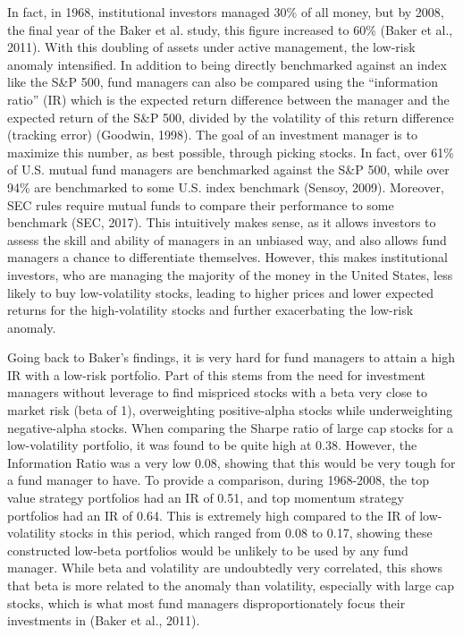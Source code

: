\documentclass[12pt,twoside]{reedthesis}
\theoremstyle{definition}
\theoremstyle{definition}
\theoremstyle{definition}
\theoremstyle{remark}
\begin{document}
In fact, in 1968, institutional investors managed 30\% of all money, but
by 2008, the final year of the Baker et al. study, this figure increased
to 60\% (Baker et al., 2011). With this doubling of assets under active
management, the low-risk anomaly intensified. In addition to being
directly benchmarked against an index like the S\&P 500, fund managers
can also be compared using the ``information ratio'' (IR) which is the
expected return difference between the manager and the expected return
of the S\&P 500, divided by the volatility of this return difference
(tracking error) (Goodwin, 1998). The goal of an investment manager is
to maximize this number, as best possible, through picking stocks. In
fact, over 61\% of U.S. mutual fund managers are benchmarked against the
S\&P 500, while over 94\% are benchmarked to some U.S. index benchmark
(Sensoy, 2009). Moreover, SEC rules require mutual funds to compare
their performance to some benchmark (SEC, 2017). This intuitively makes
sense, as it allows investors to assess the skill and ability of
managers in an unbiased way, and also allows fund managers a chance to
differentiate themselves. However, this makes institutional investors,
who are managing the majority of the money in the United States, less
likely to buy low-volatility stocks, leading to higher prices and lower
expected returns for the high-volatility stocks and further exacerbating
the low-risk anomaly.

Going back to Baker's findings, it is very hard for fund managers to
attain a high IR with a low-risk portfolio. Part of this stems from the
need for investment managers without leverage to find mispriced stocks
with a beta very close to market risk (beta of 1), overweighting
positive-alpha stocks while underweighting negative-alpha stocks. When
comparing the Sharpe ratio of large cap stocks for a low-volatility
portfolio, it was found to be quite high at 0.38. However, the
Information Ratio was a very low 0.08, showing that this would be very
tough for a fund manager to have. To provide a comparison, during
1968-2008, the top value strategy portfolios had an IR of 0.51, and top
momentum strategy portfolios had an IR of 0.64. This is extremely high
compared to the IR of low-volatility stocks in this period, which ranged
from 0.08 to 0.17, showing these constructed low-beta portfolios would
be unlikely to be used by any fund manager. While beta and volatility
are undoubtedly very correlated, this shows that beta is more related to
the anomaly than volatility, especially with large cap stocks, which is
what most fund managers disproportionately focus their investments in
(Baker et al., 2011).
\end{document}
